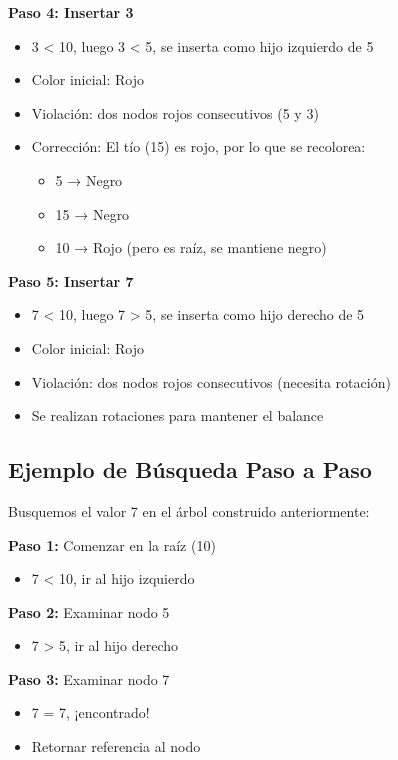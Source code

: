 \documentclass[conference]{IEEEtran}
\begin{document}
\textbf{Paso 4: Insertar 3}
\begin{itemize}
    \item 3 < 10, luego 3 < 5, se inserta como hijo izquierdo de 5
    \item Color inicial: Rojo
    \item Violación: dos nodos rojos consecutivos (5 y 3)
    \item Corrección: El tío (15) es rojo, por lo que se recolorea:
    \begin{itemize}
        \item 5 → Negro
        \item 15 → Negro
        \item 10 → Rojo (pero es raíz, se mantiene negro)
    \end{itemize}
\end{itemize}

\textbf{Paso 5: Insertar 7}
\begin{itemize}
    \item 7 < 10, luego 7 > 5, se inserta como hijo derecho de 5
    \item Color inicial: Rojo
    \item Violación: dos nodos rojos consecutivos (necesita rotación)
    \item Se realizan rotaciones para mantener el balance
\end{itemize}

\subsection{Ejemplo de Búsqueda Paso a Paso}

Busquemos el valor 7 en el árbol construido anteriormente:

\textbf{Paso 1:} Comenzar en la raíz (10)
\begin{itemize}
    \item 7 < 10, ir al hijo izquierdo
\end{itemize}

\textbf{Paso 2:} Examinar nodo 5
\begin{itemize}
    \item 7 > 5, ir al hijo derecho
\end{itemize}

\textbf{Paso 3:} Examinar nodo 7
\begin{itemize}
    \item 7 = 7, ¡encontrado!
    \item Retornar referencia al nodo
\end{itemize}
\end{document}
